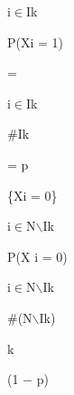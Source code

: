\documentclass[a4paper,portrait,12pt]{article}
\begin{document}
\begin{flushleft}
i$\in$Ik
\end{flushleft}





\begin{flushleft}
P(Xi = 1)
\end{flushleft}





=


\begin{flushleft}
i$\in$Ik
\end{flushleft}


\begin{flushleft}
\#Ik
\end{flushleft}





\begin{flushleft}
= p
\end{flushleft}





\begin{flushleft}
\{Xi = 0\}
\end{flushleft}


\begin{flushleft}
i$\in$N\ensuremath{\backslash}Ik
\end{flushleft}





\begin{flushleft}
P(X i = 0)
\end{flushleft}





\begin{flushleft}
i$\in$N\ensuremath{\backslash}Ik
\end{flushleft}


\begin{flushleft}
\#(N\ensuremath{\backslash}Ik)
\end{flushleft}


\begin{flushleft}
k
\end{flushleft}





\begin{flushleft}
(1 $-$ p)
\end{flushleft}
\end{document}
